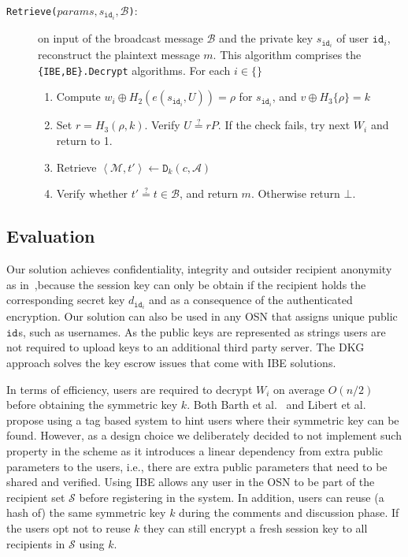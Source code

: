 \documentclass{llncs}
\newcommand{\id}[1]{\ensuremath{\mathtt{id}_{#1}}}
\begin{document}
\begin{description}
    \bigskip
    
    \item[\texttt{Retrieve($params, s_{\id{i}}, \mathcal{B}$)}:] on input of the broadcast message $\mathcal{B}$ and the private key $s_{\id{i}}$ of user $\id{i}$, reconstruct the plaintext message $m$. This algorithm comprises the \texttt{\{IBE,BE\}.Decrypt} algorithms. For each $i \in \{  \}$ \\

    \begin{enumerate}
        \item Compute $w_i \oplus H_2 \left( e \left( s_{\id{i}}, U \right) \right) = \rho$ for $s_{\id{i}}$, and $v \oplus H_3 \{ \rho \} = k$ 
        \item Set $r = H_3 \left( \rho, k \right)$. Verify $U \stackrel{?}{=} rP$. If the check fails, try next $W_i$ and return to 1.
        \item Retrieve $\left< \mathcal{M}, t' \right> \leftarrow \mathtt{D}_k(c, \mathcal{A})$
        \item Verify whether $t' \stackrel{?}{=} t \in \mathcal{B} $, and return $m$. Otherwise return $\bot$. 
    \end{enumerate}
\end{description}

\subsection{Evaluation}

Our solution achieves confidentiality, integrity and outsider recipient anonymity as in~\cite{BarthBonehWaters,BonehFranklinIBE,FazioOutsiderANOBE},because the session key can only be obtain if the recipient holds the corresponding secret key $d_{\id{i}}$ and as a consequence of the authenticated encryption. Our solution can also be used in any OSN that assigns unique public \id{}s, such as usernames. As the public keys are represented as strings  users are not required to upload keys to an additional third party server. The DKG approach solves the key escrow issues that come with IBE solutions.

In terms of efficiency, users are required to decrypt $W_i$ on average $O\left( n/2 \right)$ before obtaining the symmetric key $k$. Both Barth et al.~\cite{BarthBonehWaters} and Libert et al.~\cite{LibertANOBE} propose using a tag based system to hint users where their symmetric key can be found. However, as a design choice we deliberately decided to not implement such property in the scheme as it introduces a linear dependency from extra public parameters to the users, i.e., there are extra public parameters that need to be shared and verified. Using IBE allows any user in the OSN to be part of the recipient set $\mathcal{S}$ before registering in the system. In addition, users can reuse (a hash of) the same symmetric key $k$ during the comments and discussion phase. If the users opt not to reuse $k$ they can still encrypt a fresh session key to all recipients in $\mathcal{S}$ using $k$.
\end{document}
